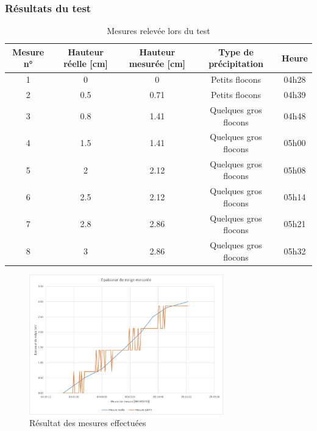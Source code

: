 \subsubsection{Résultats du test}

\begin{table}[H]
    \centering
    \begin{tabular}{|c|c|c|c|c|}
        \hline
        Mesure n° & Hauteur réelle [cm] & Hauteur mesurée [cm] & Type de précipitation & Heure \\
        \hline\hline
        1 & 0 & 0 & Petits flocons & 04h28 \\
        \hline
        2 & 0.5 & 0.71 & Petits flocons & 04h39 \\
        \hline
        3 & 0.8 & 1.41 & Quelques gros flocons & 04h48 \\
        \hline
        4 & 1.5 & 1.41 & Quelques gros flocons & 05h00 \\
        \hline
        5 & 2 & 2.12 & Quelques gros flocons & 05h08 \\
        \hline
        6 & 2.5 & 2.12 & Quelques gros flocons & 05h14 \\
        \hline
        7 & 2.8 & 2.86 & Quelques gros flocons & 05h21 \\
        \hline
        8 & 3 & 2.86 & Quelques gros flocons & 05h32 \\
        \hline
        
    \end{tabular}
    \caption{Mesures relevée lors du test}
    \label{table:SnowingState}
\end{table}

\begin{figure}[H]
    \centering
    \includegraphics[width=0.75\textwidth]{Images/LiDAR/ReadTests_Results.png}
    \caption{Résultat des mesures effectuées}
    \label{fig:RealTest_Results}
\end{figure}

